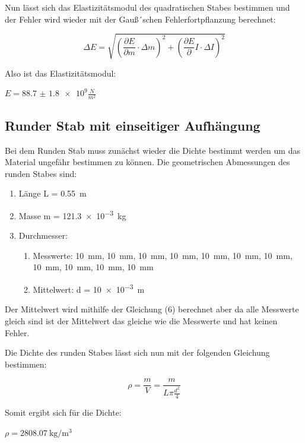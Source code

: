 Nun lässt sich das Elastizitätsmodul des quadratischen Stabes bestimmen und der Fehler
wird wieder mit der Gauß´schen Fehlerfortpflanzung berechnet:

\begin{equation}
  \Delta E = \sqrt{\left(\frac{\partial E}{\partial m} \cdot \Delta m \right)^2 +
  \left( \frac{\partial E}{\partial} I \cdot \Delta I \right)^2}
\end{equation}

Also ist das Elastizitätsmodul: \\
\centerline{$E = \num{88.7(18)e9} \frac{N}{m^2}$}

\subsection{Runder Stab mit einseitiger Aufhängung}

Bei dem Runden Stab muss zunächst wieder die Dichte bestimmt werden um das Material
ungefähr bestimmen zu können. Die geometrischen Abmessungen des runden Stabes sind:

\begin{enumerate}
  \item Länge L = \SI{0.55}{\meter}
  \item Masse m = \SI{121.3e-3}{\kilo\gram}
  \item Durchmesser:
  \begin{enumerate}
    \item Messwerte: \SI{10}{\milli\meter}, \SI{10}{\milli\meter}, \SI{10}{\milli\meter},
    \SI{10}{\milli\meter}, \SI{10}{\milli\meter}, \SI{10}{\milli\meter},
    \SI{10}{\milli\meter}, \SI{10}{\milli\meter}, \SI{10}{\milli\meter},
    \SI{10}{\milli\meter}, \SI{10}{\milli\meter}
    \item Mittelwert: d = \SI{10e-3}{\meter}
  \end{enumerate}
\end{enumerate}

Der Mittelwert wird mithilfe der Gleichung (6) berechnet aber da alle Messwerte gleich
sind ist der Mittelwert das gleiche wie die Messwerte und hat keinen Fehler.

Die Dichte des runden Stabes lässt sich nun mit der folgenden Gleichung bestimmen:

\begin{equation}
  \rho = \frac{m}{V} = \frac{m}{L \pi \frac{d^2}{4}}
\end{equation}

Somit ergibt sich für die Dichte:\\
\centerline{$\rho = \SI[per-mode=fraction]{2808.07}{\kilo\gram\per\meter
\tothe{3}}$}

